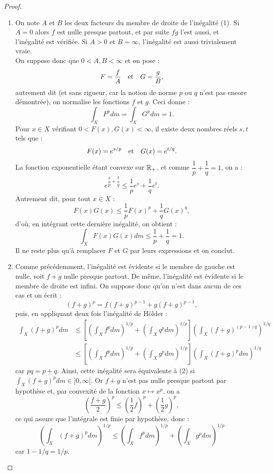 \begin{proof}
\begin{enumerate}[label=(\alph*)]

\item
On note $A$ et $B$ les deux facteurs du membre de droite de l'inégalité (1). Si $A=0$ alors $f$ est nulle presque partout, 
et par suite $fg$  l'est aussi, et l'inégalité est vérifiée. Si $A>0$ et $B = \infty$, l'inégalité est aussi trivialement vraie. \\
On suppose donc que $0 < A, B < \infty$ et on pose :
\[ F = \dfrac{f}{A} \quad \text{et} \quad G = \dfrac{g}{B} , \]
autrement dit (et sans rigueur, car la notion de norme $p$ ou $q$ n'est pas encore démontrée), 
on \og normalise \fg{} les fonctions $f$ et $g$.
Ceci donne :
\[ \int_X F^p dm = \int_X G^p dm = 1 . \]
Pour $x \in X$ vérifiant $0 < F(x), G(x) < \infty$, il existe deux nombres réels $s, t$ tels que :
\[ F(x) = e^{s/p} \quad \text{et} \quad G(x) = e^{t/q} . \]
La fonction exponentielle étant convexe sur $\mathbb{R}_+$, et comme $\dfrac1{p} + \dfrac1{q} = 1$, on a :
\[ e^{\dfrac{s}{p} + \dfrac{t}{q}} \leq \dfrac1{p} e^s + \dfrac1{q} e^t . \]
Autrement dit, pour tout $x \in X$ :
\[ F(x)G(x) \leq \dfrac1{p} F(x)^p + \dfrac1{q} G(x)^q , \]
d'où, en intégrant cette dernière inégalité, on obtient :
\[ \int_X F(x)G(x) dm \leq \dfrac1{p} + \dfrac1{q} = 1 . \]
Il ne reste plus qu'à remplacer $F$ et $G$ par leurs expressions et on conclut.

\item
Comme précédemment, l'inégalité est évidente si le membre de gauche est nulle, soit $f+g$ nulle presque partout.
De même, l'inégalité est évidente si le membre de droite est infini. 
On suppose donc qu'on n'est dans aucun de ces cas et on écrit :
\[ (f+g)^p = f(f+g)^{p-1} + g(f+g)^{p-1} , \]
puis, en appliquant deux fois l'inégalité de Hölder :
\begin{align*}
\int_X (f+g)^p dm & \leq \left [ \left( \int_X f^p dm \right )^{1/p} + \left( \int_X q^p dm \right )^{1/p} \right ] 
 \left ( \int_X  (f+g)^{(p-1)q} \right )^{1/q} \\
& \leq \left [ \left( \int_X f^p dm \right )^{1/p} + \left( \int_X g^p dm \right )^{1/p} \right ]  \left ( \int_X  (f+g)^p dm \right )^{1/q}  
\end{align*}
car $pq = p + q$. Ainsi, cette inégalité sera équivalente à (2) si $\int_X (f+g)^p dm \in ]0, \infty[$. 
Or $f+g$ n'est pas nulle presque partout par hypothèse et, par convexité de la fonction $x \mapsto x^p$, on a 
\[ \left(\dfrac{f+g}2 \right)^p \leq \left( \dfrac1{2} f \right )^p + \left( \dfrac1{2} g \right )^p , \]
ce qui assure que l'intégrale est finie par hypothèse, donc :
\[ \left ( \int_X (f+g)^p dm \right )^{1/p} \leq \left( \int_X f^p dm \right )^{1/p} + \left( \int_X g^p dm \right )^{1/p} \]
car $1-1/q = 1/p$.
\end{enumerate}
\end{proof}

